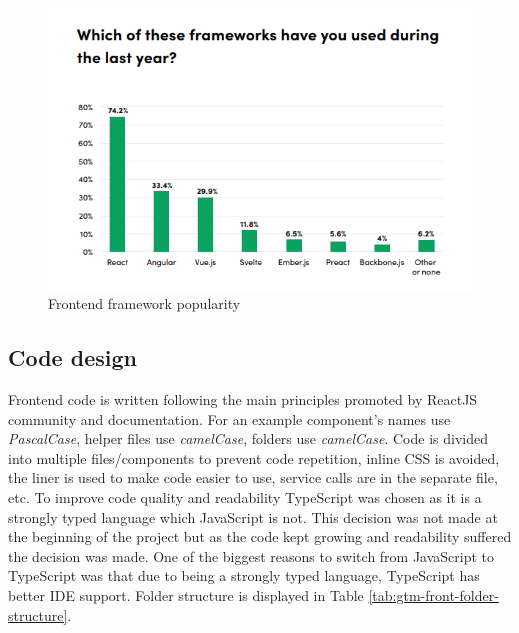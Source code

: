 \begin{figure}[h]
    \includegraphics[width=\textwidth]{figures/frontend_framework_popularity}
    \caption{Frontend framework popularity~\cite{state-of-frontend-report}}
    \label{fig:frontend-framework-popularity}
\end{figure}

\subsection{Code design}\label{subsec:code-design}
Frontend code is written following the main principles promoted by ReactJS community and documentation.
For an example component's names use \textit{PascalCase}, helper files use \textit{camelCase}, folders use \textit{camelCase}.
Code is divided into multiple files/components to prevent code repetition, inline CSS is avoided, the liner is used to make code easier to use, service calls are in the separate file, etc.
To improve code quality and readability TypeScript was chosen as it is a strongly typed language which JavaScript is not.
This decision was not made at the beginning of the project but as the code kept growing and readability suffered the decision was made.
One of the biggest reasons to switch from JavaScript to TypeScript was that due to being a strongly typed language,
TypeScript has better IDE support.
Folder structure is displayed in Table
\ref{tab:gtm-front-folder-structure}.

